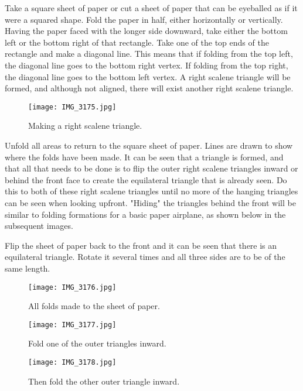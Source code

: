 \documentclass{article}
\begin{document}
Take a square sheet of paper or cut a sheet of paper that can be eyeballed as if it were a squared shape. Fold the paper in half, either horizontally or vertically. Having the paper faced with the longer side downward, take either the bottom left or the bottom right of that rectangle. Take one of the top ends of the rectangle and make a diagonal line. This means that if folding from the top left, the diagonal line goes to the bottom right vertex. If folding from the top right, the diagonal line goes to the bottom left vertex. A right scalene triangle will be formed, and although not aligned, there will exist another right scalene triangle. 

\begin{figure}[t]
    \centering
    \texttt{[image: IMG\_3175.jpg]}
    \caption{Making a right scalene triangle. }
    \label{fig:my_label}
\end{figure}

Unfold all areas to return to the square sheet of paper. Lines are drawn to show where the folds have been made. It can be seen that a triangle is formed, and that all that needs to be done is to flip the outer right scalene triangles inward or behind the front face to create the equilateral triangle that is already seen. Do this to both of these right scalene triangles until no more of the hanging triangles can be seen when looking upfront. "Hiding" the triangles behind the front will be similar to folding formations for a basic paper airplane, as shown below in the subsequent images.

Flip the sheet of paper back to the front and it can be seen that there is an equilateral triangle. Rotate it several times and all three sides are to be of the same length. 

\begin{figure}[h]
    \centering
    \texttt{[image: IMG\_3176.jpg]}
    \caption{All folds made to the sheet of paper. }
    \label{fig:my_label}
\end{figure}

\begin{figure}[h]
    \centering
    \texttt{[image: IMG\_3177.jpg]}
    \caption{Fold one of the outer triangles inward. }
    \label{fig:my_label}
\end{figure}

\begin{figure}[h]
    \centering
    \texttt{[image: IMG\_3178.jpg]}
    \caption{Then fold the other outer triangle inward. }
    \label{fig:my_label}
\end{figure}
\end{document}
